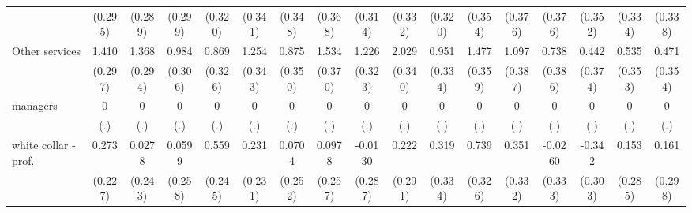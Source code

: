 {\begin{tabular}{l*{16}{c}}
                    &     (0.295)         &     (0.289)         &     (0.299)         &     (0.320)         &     (0.341)         &     (0.348)         &     (0.368)         &     (0.314)         &     (0.332)         &     (0.320)         &     (0.354)         &     (0.376)         &     (0.376)         &     (0.352)         &     (0.334)         &     (0.338)         \\
[1em]
Other services      &       1.410\sym{***}&       1.368\sym{***}&       0.984\sym{**} &       0.869\sym{**} &       1.254\sym{***}&       0.875\sym{*}  &       1.534\sym{***}&       1.226\sym{***}&       2.029\sym{***}&       0.951\sym{**} &       1.477\sym{***}&       1.097\sym{**} &       0.738         &       0.442         &       0.535         &       0.471         \\
                    &     (0.297)         &     (0.294)         &     (0.306)         &     (0.326)         &     (0.343)         &     (0.350)         &     (0.370)         &     (0.323)         &     (0.340)         &     (0.334)         &     (0.359)         &     (0.387)         &     (0.386)         &     (0.374)         &     (0.353)         &     (0.354)         \\
[1em]
managers            &           0         &           0         &           0         &           0         &           0         &           0         &           0         &           0         &           0         &           0         &           0         &           0         &           0         &           0         &           0         &           0         \\
                    &         (.)         &         (.)         &         (.)         &         (.)         &         (.)         &         (.)         &         (.)         &         (.)         &         (.)         &         (.)         &         (.)         &         (.)         &         (.)         &         (.)         &         (.)         &         (.)         \\
[1em]
white collar - prof.&       0.273         &      0.0278         &      0.0599         &       0.559\sym{*}  &       0.231         &      0.0704         &      0.0978         &     -0.0130         &       0.222         &       0.319         &       0.739\sym{*}  &       0.351         &     -0.0260         &      -0.342         &       0.153         &       0.161         \\
                    &     (0.227)         &     (0.243)         &     (0.258)         &     (0.245)         &     (0.231)         &     (0.252)         &     (0.257)         &     (0.287)         &     (0.291)         &     (0.334)         &     (0.326)         &     (0.332)         &     (0.333)         &     (0.303)         &     (0.285)         &     (0.298)         \\

\end{tabular}}
